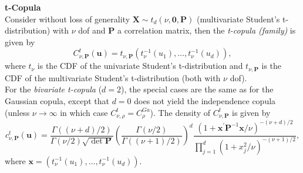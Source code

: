 \textbf{t-Copula}\\
Consider without loss of generality $\bm{X} \sim {t_{d}(\nu, \bm{0}, \mathbf{P})}$ (multivariate Student's t-distribution) with $\nu$ \ac{dof} and $\bm{P}$ a correlation matrix, then the \textit{t-copula (family)} is given by
\begin{equation}
C_{\nu, \bm{P}}^{t}(\mathbf{u})=t_{\nu, \bm{P}}\left(t_{\nu}^{-1}\left(u_{1}\right), \ldots, t_{\nu}^{-1}\left(u_{d}\right)\right),
\end{equation}
where $t_{\nu}$ is the \ac{CDF} of the univariate Student's t-distribution  and $t_{\nu, \bm{P}}$ is the \ac{CDF} of the multivariate Student's t-distribution (both with $\nu$ \ac{dof}).\\
For the \textit{bivariate t-copula} ($d=2$), the special cases are the same as for the Gaussian copula, except that $d=0$ does not yield the independence copula (unless $\nu \rightarrow \infty$ in which case  $ C_{\nu, \rho}^{t} = C_{\rho}^{G a}$). The density of $C_{\nu, \bm{P}}^{t}$ is given by
\begin{equation}
c_{\nu, \mathbf{P}}^{t}(\boldsymbol{u})=\frac{\Gamma((\nu+d) / 2)}{\Gamma(\nu / 2) \sqrt{\operatorname{det} \mathbf{P}}}\left(\frac{\Gamma(\nu / 2)}{\Gamma((\nu+1) / 2)}\right)^{d} \frac{\left(1+\boldsymbol{x}^{\prime} \mathbf{P}^{-1} \boldsymbol{x} / \nu\right)^{-(\nu+d) / 2}}{\prod_{j=1}^{d}\left(1+x_{j}^{2} / \nu\right)^{-(\nu+1) / 2}},
\end{equation}
where $\bm{x} = \left(t_{\nu}^{-1}\left(u_{1}\right), \ldots, t_{\nu}^{-1}\left(u_{d}\right)\right)$.
\\


